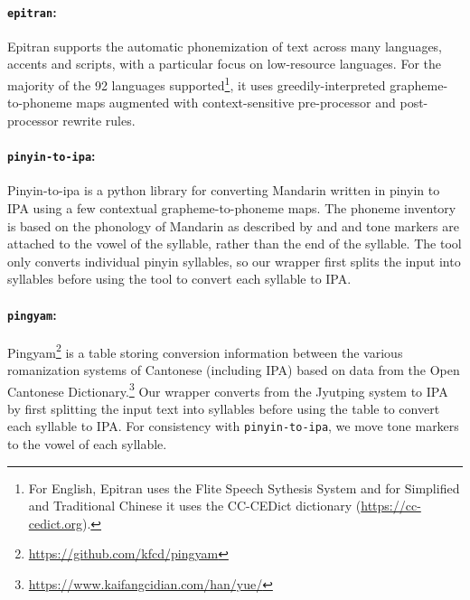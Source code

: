 \paragraph{\texttt{epitran}:} Epitran \citep{Mortensen-et-al:2018} supports the automatic phonemization of text across many languages, accents and scripts, with a particular focus on low-resource languages. For the majority of the 92 languages supported\footnote{For English, Epitran uses the Flite Speech Sythesis System \citep{black2001flite} and for Simplified and Traditional Chinese it uses the CC-CEDict dictionary (\url{https://cc-cedict.org}).}, it uses greedily-interpreted grapheme-to-phoneme maps augmented with context-sensitive pre-processor and post-processor rewrite rules.

\paragraph{\texttt{pinyin-to-ipa}:} Pinyin-to-ipa \citep{taubert_2024_pinyin-to-ipa_2024} is a python library for converting Mandarin written in pinyin to IPA using a few contextual grapheme-to-phoneme maps. The phoneme inventory is based on the phonology of Mandarin as described by \cite{lin2007sounds} and \cite{duanmu2007phonology} and tone markers are attached to the vowel of the syllable, rather than the end of the syllable. The tool only converts individual pinyin syllables, so our wrapper first splits the input into syllables before using the tool to convert each syllable to IPA.

\paragraph{\texttt{pingyam}:} Pingyam\footnote{\url{https://github.com/kfcd/pingyam}} is a table storing conversion information between the various romanization systems of Cantonese (including IPA) based on data from the Open Cantonese Dictionary.\footnote{\url{https://www.kaifangcidian.com/han/yue/}} Our wrapper converts from the Jyutping system to IPA by first splitting the input text into syllables before using the table to convert each syllable to IPA. For consistency with \texttt{pinyin-to-ipa}, we move tone markers to the vowel of each syllable. 


